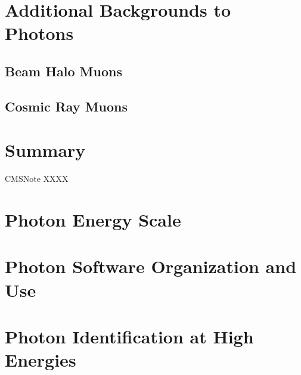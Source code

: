 \documentclass{cmspaper}
\begin{document}
\section{Additional Backgrounds to Photons}
\subsection{Beam Halo Muons}
\subsection{Cosmic Ray Muons}

\section{Summary}

\begin{thebibliography}{9}
  CMSNote XXXX


\end{thebibliography}
 
\pagebreak
\appendix
\section{Photon Energy Scale}

\section{Photon Software Organization and Use}

\section{Photon Identification at High Energies}
\end{document}
